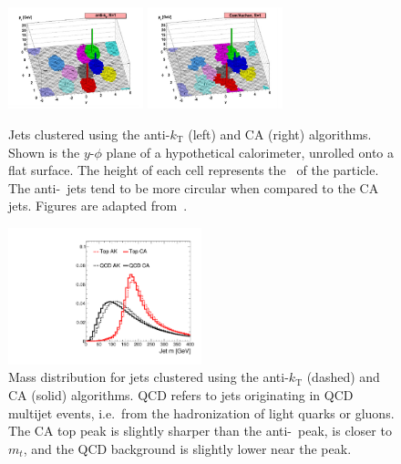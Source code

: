 \begin{figure}[]
    \begin{center}
        \includegraphics[width=0.35\textwidth]{figures/toptagging/gen/ak.png}
        \includegraphics[width=0.35\textwidth]{figures/toptagging/gen/ca.png}
        \caption{Jets clustered using the anti-$k_\mathrm{T}$ (left) and CA (right) algorithms.
                 Shown is the $y$-$\phi$ plane of a hypothetical calorimeter, unrolled onto a flat surface.
                 The height of each cell represents the \pt~of the particle. 
                 The anti-\kt~jets tend to be more circular when compared to the CA jets.
                 Figures are adapted from~\cite{antikt}.}
        \label{fig:jets:algos}
    \end{center}
\end{figure}

\begin{figure}[]
    \begin{center}
        \includegraphics[width=0.5\textwidth]{figures/toptagging/gen/clf_M.pdf}
        \caption{Mass distribution for jets clustered using the anti-$k_\mathrm{T}$ (dashed) and CA (solid) algorithms.
                 QCD refers to jets originating in QCD multijet events, i.e.~from the hadronization of light quarks or gluons.
                 The CA top peak is slightly sharper than the anti-\kt~peak, is closer to $m_t$, and the QCD background is slightly lower near the peak.
                 }
        \label{fig:jets:caak}
    \end{center}
\end{figure}

